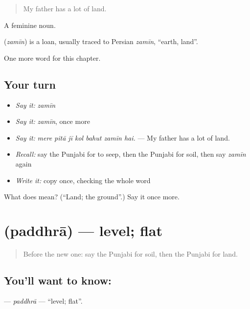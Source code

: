 \begin{quote}
My father has a lot of land.
\end{quote}

A feminine noun.

\begin{cousinweb}
\textbf{} (\emph{zamīn}) is a loan, usually traced to Persian \emph{zamīn}, \textquotedblleft{}earth, land\textquotedblright{}.
\end{cousinweb}

\begin{grammarlens}[title={What you've built}]
One more word for this chapter.
\end{grammarlens}

\subsection*{Your turn}
\begin{itemize}
\raggedright
  \item \emph{Say it:} \emph{zamīn}
  \item \emph{Say it:} \emph{zamīn}, once more
  \item \emph{Say it:} \emph{mere pitā jī kol bahut zamīn hai.} — My father has a lot of land.
  \item \emph{Recall:} say the Punjabi for to seep, then the Punjabi for soil, then say \emph{zamīn} again
  \item \emph{Write it:} copy \textbf{} once, checking the whole word
\end{itemize}

\begin{tcolorbox}[breakable,colback=teal!4,colframe=teal!35!black,title={Before you move on}]
What does  mean? (\textquotedblleft{}Land; the ground\textquotedblright{}.) Say it once more.
\end{tcolorbox}
\section[\texorpdfstring{\pa{ਪੱਧਰਾ} (paddhrā)}{ਪੱਧਰਾ (paddhrā)}]{ (paddhrā) — level; flat}

\label{lesson:PA-C293-paddhra}



\begin{quote}
Before the new one: say the Punjabi for soil, then the Punjabi for land.
\end{quote}

\subsection*{You'll want to know: }
\textbf{} — \emph{paddhrā} — \textquotedblleft{}level; flat\textquotedblright{}.

